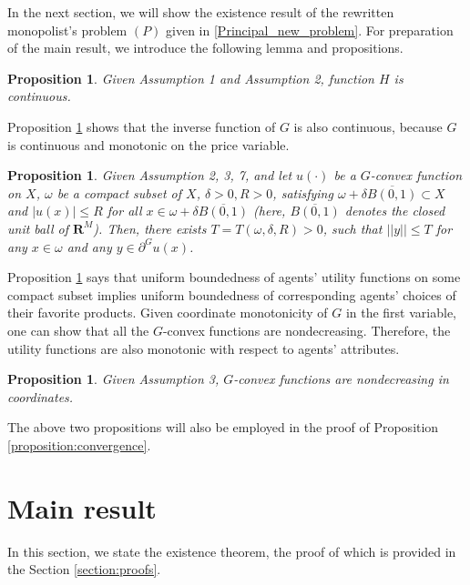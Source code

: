 \documentclass[a4paper, 11pt]{amsart}
\numberwithin{equation}{section}
\theoremstyle{plain}
\newtheorem{proposition}[theorem]{Proposition}
\theoremstyle{definition}
\theoremstyle{remark}
\newcommand{\R}{\mathbf{R}}
\begin{document}
\medskip
In the next section, we will show the existence result of the rewritten monopolist's problem $(P)$ given in \eqref{Principal_new_problem}. For preparation of the main result, we introduce the following lemma and propositions. \medskip

\begin{proposition}\label{lemma_continuity}
	Given Assumption 1 and Assumption 2, function $H$ is continuous.
\end{proposition}
Proposition \ref{lemma_continuity} shows that the inverse function of $G$ is also continuous, because $G$ is continuous and monotonic on the price variable. \medskip

\begin{proposition}\label{Subdiff/Bdd}
	Given Assumption 2, 3, 7, and let $u(\cdot)$ be a $G$-convex function on $X$, $\omega$ be a compact subset of $X$, $\delta>0, R>0$, satisfying $\omega+\delta\overline{B(0,1)}\subset X$ and $|u(x)|\le R$ for all $x\in \omega + \delta \overline{B(0,1)}$ (here, $\overline{B(0,1)}$ denotes the closed unit ball of $\R^M$). Then, there exists $T = T(\omega,\delta, R) > 0$, such that $||y||\le T$ for any $x \in \omega$ and any $y\in \partial^Gu(x)$.
\end{proposition}

Proposition \ref{Subdiff/Bdd} says that uniform boundedness of agents' utility functions on some compact subset implies uniform boundedness of corresponding agents' choices of their favorite products. Given coordinate monotonicity of $G$ in the first variable, one can show that all the $G$-convex functions are nondecreasing. Therefore, the utility functions are also monotonic with respect to agents' attributes. 



\begin{proposition}\label{nondecreasing}
	Given Assumption 3, $G$-convex functions are nondecreasing in coordinates.
\end{proposition}

The above two propositions will also be employed in the proof of Proposition \ref{proposition:convergence}. 

\bigskip







\section{Main result}\label{section:mainresult}
In this section, we state the existence theorem, the proof of which is provided in the Section \ref{section:proofs}. 
\end{document}
